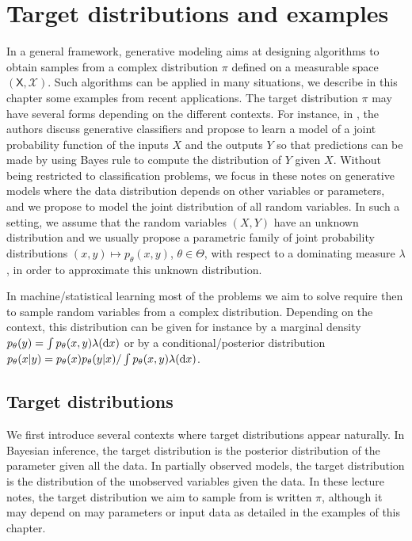 \documentclass[english,graybox,envcountchap,envcountsame,sectrefs,shortlabels]{svmono}
\theoremstyle{style}
\begin{document}
\chapter{Target distributions and examples}
In a general framework, generative modeling aims at designing algorithms to obtain samples from a complex distribution $\pi$ defined on a measurable space $(\mathsf{X},\mathcal{X})$. Such algorithms can be applied in many situations, we describe in this chapter some examples from recent applications. The target distribution $\pi$ may have several forms depending on the different contexts.
 For instance, in \cite{ng2001discriminative}, the authors discuss generative classifiers and propose to learn a model of a joint probability function of the inputs $X$ and the outputs $Y$ so that predictions can be made by using Bayes rule to compute the distribution of $Y$ given $X$. Without being restricted to classification problems, we focus in these notes on generative models where the data distribution depends on other variables or parameters, and we propose to model the joint distribution of all random variables. In such a setting, we assume that the random variables $(X,Y)$ have an unknown distribution and we usually propose a parametric family of joint probability distributions $(x,y)\mapsto p_\theta(x,y)$, $\theta\in\Theta$, with respect to a dominating measure $\lambda$, in order to approximate this unknown distribution. 

In machine/statistical learning most of the problems we aim to solve require then to sample random variables from a complex distribution. Depending on the context, this distribution can be given for instance by a marginal density $p_\theta(y) = \int p_\theta(x,y) \lambda(\mathrm{d} x)$ or by a conditional/posterior distribution $p_\theta(x|y) = p_\theta(x)p_\theta(y|x)/\int p_\theta(x,y) \lambda(\mathrm{d} x)$.



\section{Target distributions}
We first introduce several contexts where target distributions appear naturally. In Bayesian inference, the target distribution is the posterior distribution of the parameter given all the data. In partially observed models, the target distribution is the distribution of the unobserved variables given the data. In these lecture notes, the target distribution we aim to sample from is written $\pi$, although it may depend on may parameters or input data as detailed in the examples of this chapter.
\end{document}
